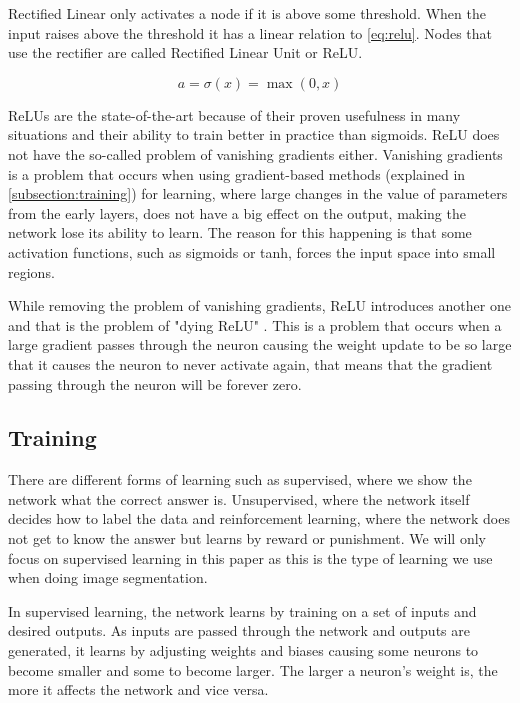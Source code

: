 Rectified Linear only activates a node if it is above some threshold. When the input raises above the threshold it has a linear relation to \autoref{eq:relu}. Nodes that use the rectifier are called Rectified Linear Unit or ReLU. 

\begin{equation}
\label{eq:relu}
a = \sigma(x) = \max(0, x)
\end{equation}


ReLUs are the state-of-the-art because of their proven usefulness in many situations and their ability to train better in practice than sigmoids. ReLU does not have the so-called problem of vanishing gradients either. Vanishing gradients is a problem that occurs when using gradient-based methods (explained in \autoref{subsection:training}) for learning, where large changes in the value of parameters from the early layers, does not have a big effect on the output, making the network lose its ability to learn. The reason for this happening is that some activation functions, such as sigmoids or tanh, forces the input space into small regions. 

While removing the problem of vanishing gradients, ReLU introduces another one and that is the problem of "dying ReLU" \citet{Li}. This is a problem that occurs when a large gradient passes through the neuron causing the weight update to be so large that it causes the neuron to never activate again, that means that the gradient passing through the neuron will be forever zero.


\subsection{Training}\label{subsection:training}
There are different forms of learning such as supervised, where we show the network what the correct answer is. Unsupervised, where the network itself decides how to label the data and reinforcement learning, where the network does not get to know the answer but learns by reward or punishment. We will only focus on supervised learning in this paper as this is the type of learning we use when doing image segmentation.

In supervised learning, the network learns by training on a set of inputs and desired outputs. As inputs are passed through the network and outputs are generated, it learns by adjusting weights and biases causing some neurons to become smaller and some to become larger. The larger a neuron's weight is, the more it affects the network and vice versa.

